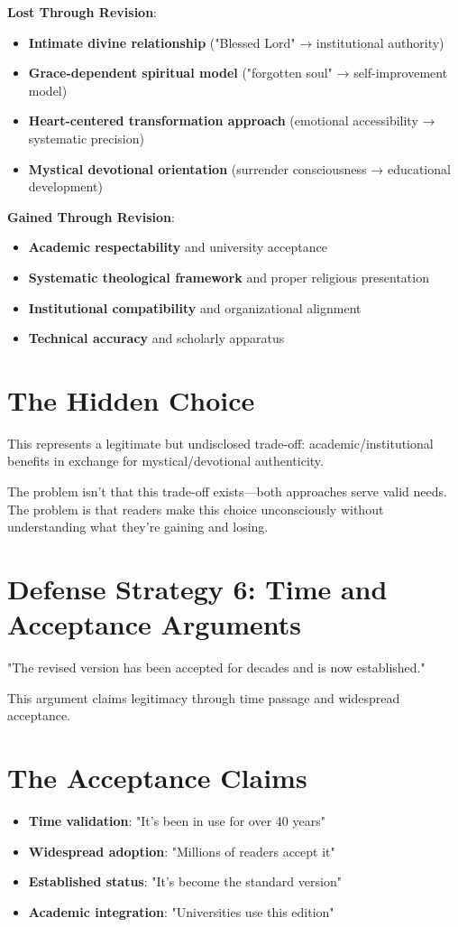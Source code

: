 \documentclass[11pt,twoside]{book}
\begin{document}
\textbf{\textbf{Lost Through Revision}}:
\begin{itemize}
\item \textbf{\textbf{Intimate divine relationship}} ("Blessed Lord" → institutional authority)
\item \textbf{\textbf{Grace-dependent spiritual model}} ("forgotten soul" → self-improvement model)
\item \textbf{\textbf{Heart-centered transformation approach}} (emotional accessibility → systematic precision)
\item \textbf{\textbf{Mystical devotional orientation}} (surrender consciousness → educational development)
\end{itemize}

\textbf{\textbf{Gained Through Revision}}:
\begin{itemize}
\item \textbf{\textbf{Academic respectability}} and university acceptance
\item \textbf{\textbf{Systematic theological framework}} and proper religious presentation
\item \textbf{\textbf{Institutional compatibility}} and organizational alignment
\item \textbf{\textbf{Technical accuracy}} and scholarly apparatus
\end{itemize}
\section*{The Hidden Choice}
\label{sec:org6ea8e7e}
This represents a legitimate but undisclosed trade-off: academic/institutional benefits in exchange for mystical/devotional authenticity.

The problem isn't that this trade-off exists—both approaches serve valid needs. The problem is that readers make this choice unconsciously without understanding what they're gaining and losing.
\section*{Defense Strategy 6: Time and Acceptance Arguments}
\label{sec:orgea5c45a}

"The revised version has been accepted for decades and is now established."

This argument claims legitimacy through time passage and widespread acceptance.
\section*{The Acceptance Claims}
\label{sec:orga7d6ab4}
\begin{itemize}
\item \textbf{\textbf{Time validation}}: "It's been in use for over 40 years"
\item \textbf{\textbf{Widespread adoption}}: "Millions of readers accept it"
\item \textbf{\textbf{Established status}}: "It's become the standard version"
\item \textbf{\textbf{Academic integration}}: "Universities use this edition"
\end{itemize}
\end{document}
